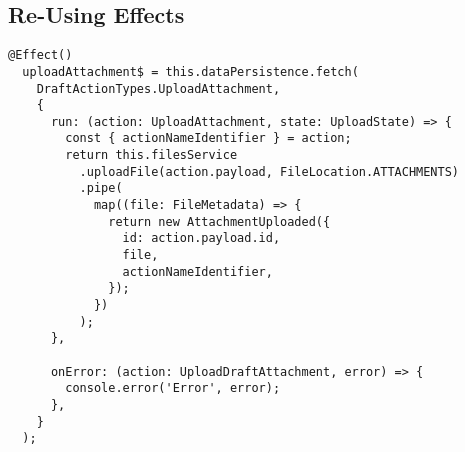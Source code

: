 \subsection{Re-Using Effects}
\begin{lstlisting}
@Effect()
  uploadAttachment$ = this.dataPersistence.fetch(
    DraftActionTypes.UploadAttachment,
    {
      run: (action: UploadAttachment, state: UploadState) => {
        const { actionNameIdentifier } = action;
        return this.filesService
          .uploadFile(action.payload, FileLocation.ATTACHMENTS)
          .pipe(
            map((file: FileMetadata) => {
              return new AttachmentUploaded({
                id: action.payload.id,
                file,
                actionNameIdentifier,
              });
            })
          );
      },

      onError: (action: UploadDraftAttachment, error) => {
        console.error('Error', error);
      },
    }
  );
\end{lstlisting}

